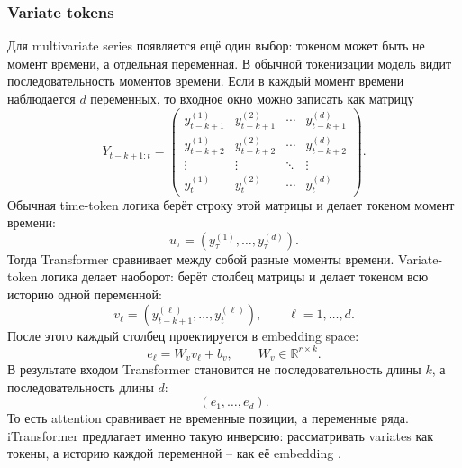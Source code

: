 \documentclass[12pt,fleqn]{article}
\begin{document}
\subsubsection{Variate tokens}

Для multivariate series появляется ещё один выбор: токеном может быть не момент времени, а отдельная переменная.
В обычной токенизации модель видит последовательность моментов времени.
Если в каждый момент времени наблюдается $d$ переменных, то входное окно можно записать как матрицу
\begin{equation}
  Y_{t-k+1:t}
  =
  \begin{pmatrix}
    y_{t-k+1}^{(1)} & y_{t-k+1}^{(2)} & \cdots & y_{t-k+1}^{(d)} \\
    y_{t-k+2}^{(1)} & y_{t-k+2}^{(2)} & \cdots & y_{t-k+2}^{(d)} \\
    \vdots & \vdots & \ddots & \vdots \\
    y_t^{(1)} & y_t^{(2)} & \cdots & y_t^{(d)}
  \end{pmatrix}.
\end{equation}
Обычная time-token логика берёт строку этой матрицы и делает токеном момент времени:
\begin{equation}
  u_\tau =
  (y_\tau^{(1)}, \ldots, y_\tau^{(d)}).
\end{equation}
Тогда Transformer сравнивает между собой разные моменты времени.
Variate-token логика делает наоборот: берёт столбец матрицы и делает токеном всю историю одной переменной:
\begin{equation}
  v_\ell =
  (y_{t-k+1}^{(\ell)}, \ldots, y_t^{(\ell)}),
  \qquad
  \ell = 1, \ldots, d.
\end{equation}
После этого каждый столбец проектируется в embedding space:
\begin{equation}
  e_\ell = W_v v_\ell + b_v,
  \qquad
  W_v \in \mathbb{R}^{r \times k}.
\end{equation}
В результате входом Transformer становится не последовательность длины $k$, а последовательность длины $d$:
\begin{equation}
  (e_1, \ldots, e_d).
\end{equation}
То есть attention сравнивает не временные позиции, а переменные ряда.
iTransformer предлагает именно такую инверсию: рассматривать variates как токены, а историю каждой переменной -- как её embedding \cite{liu2024itransformer}.
\end{document}
